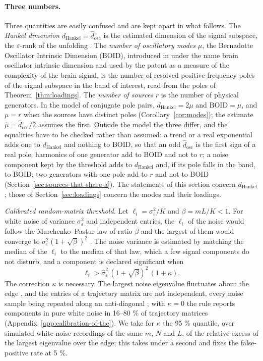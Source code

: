 \documentclass{article}
\begin{document}
\paragraph{Three numbers.} Three quantities are easily confused and are kept apart in what follows. The \emph{Hankel dimension} $d_{\mathrm{Hankel}} = \widehat{d}_{\mathrm{osc}}$ is the estimated dimension of the signal subspace, the $\varepsilon$-rank of the unfolding \cite{ref-BernadotteBuchstaber}. The \emph{number of oscillatory modes} $\mu$, the Bernadotte Oscillator Intrinsic Dimension (BOID), introduced in \cite{ref-Bernadotte07} under the name brain oscillator intrinsic dimension and used by the patent \cite{pat-complexity} as a measure of the complexity of the brain signal, is the number of resolved positive-frequency poles of the signal subspace in the band of interest, read from the poles of Theorem~\ref{thm:loadings}. The \emph{number of sources} $r$ is the number of physical generators. In the model of conjugate pole pairs, $d_{\mathrm{Hankel}} = 2\mu$ and $\mathrm{BOID} = \mu$, and $\mu = r$ when the sources have distinct poles (Corollary~\ref{cor:modes}); the estimate $\widehat{\mu} = \widehat{d}_{\mathrm{osc}}/2$ assumes the first. Outside the model the three differ, and the equalities have to be checked rather than assumed: a trend or a real exponential adds one to $d_{\mathrm{Hankel}}$ and nothing to BOID, so that an odd $\widehat{d}_{\mathrm{osc}}$ is the first sign of a real pole; harmonics of one generator add to BOID and not to $r$; a noise component kept by the threshold adds to $d_{\mathrm{Hankel}}$ and, if its pole falls in the band, to BOID; two generators with one pole add to $r$ and not to BOID (Section~\ref{sec:sources-that-share-a}). The statements of this section concern $d_{\mathrm{Hankel}}$; those of Section~\ref{sec:loadings} concern the modes and their loadings.

\emph{Calibrated random-matrix threshold.} Let $\ell_i = \sigma_i^2 / K$ and $\beta = mL/K < 1$. For white noise of variance $\sigma_\varepsilon^2$ and independent entries, the $\ell_i$ of the noise would follow the Marchenko--Pastur law of ratio $\beta$ and the largest of them would converge to $\sigma_\varepsilon^2 (1 + \sqrt{\beta})^2$ \cite{ref-Marchenko, ref-Yin}. The noise variance is estimated by matching the median of the $\ell_i$ to the median of that law, which a few signal components do not disturb, and a component is declared significant when \[
\ell_i > \widehat{\sigma}_\varepsilon^{2}\, (1 + \sqrt{\beta})^{2}\, (1 + \kappa).
\] The correction $\kappa$ is necessary. The largest noise eigenvalue fluctuates about the edge \cite{ref-Johnstone}, and the entries of a trajectory matrix are not independent, every noise sample being repeated along an anti-diagonal \cite{ref-Bryc}; with $\kappa = 0$ the rule reports components in pure white noise in 16--80 \% of trajectory matrices (Appendix~\ref{app:calibration-of-the}). We take for $\kappa$ the 95 \% quantile, over simulated white-noise recordings of the same $m$, $N$ and $L$, of the relative excess of the largest eigenvalue over the edge; this takes under a second and fixes the false-positive rate at 5 \%.
\end{document}
